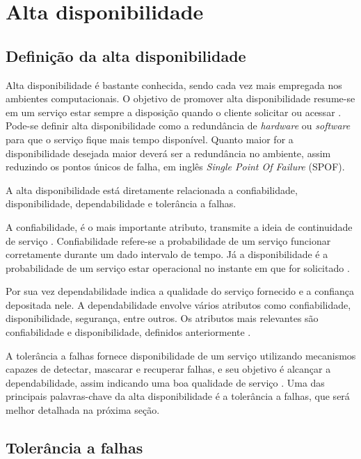 \chapter{Alta disponibilidade}

\section{Definição da alta disponibilidade}

Alta disponibilidade é bastante conhecida, sendo cada vez mais empregada nos ambientes computacionais.
O objetivo de promover alta disponibilidade resume-se em um serviço estar sempre 
a disposição quando o cliente solicitar ou acessar \cite{costa2009}.
Pode-se definir alta disponibilidade como a redundância de \textit{hardware} ou \textit{software} para que o serviço fique mais tempo disponível.
Quanto maior for a disponibilidade desejada maior deverá ser a redundância no ambiente, assim reduzindo os pontos únicos de falha,
em inglês \textit{Single Point Of Failure} (SPOF).

A alta disponibilidade está diretamente relacionada a confiabilidade, disponibilidade, dependabilidade e tolerância a falhas. 

A confiabilidade, é o mais importante atributo, transmite a ideia de continuidade de serviço \cite{pankaj1994}. Confiabilidade refere-se 
a probabilidade de um serviço funcionar corretamente durante um dado intervalo de tempo. Já a disponibilidade é a probabilidade de um 
serviço estar operacional no instante em que for solicitado \cite{costa2009}.

Por sua vez dependabilidade indica a qualidade do serviço fornecido e a confiança depositada nele. A dependabilidade envolve vários
atributos como confiabilidade, disponibilidade, segurança, entre outros. Os atributos mais relevantes são confiabilidade e disponibilidade,
definidos anteriormente \cite{weber2002}.

A tolerância a falhas fornece disponibilidade de um serviço utilizando mecanismos capazes de detectar, mascarar e recuperar falhas, 
e seu objetivo é alcançar a dependabilidade, assim indicando uma boa qualidade de serviço \cite{costa2009}.
Uma das principais palavras-chave da alta disponibilidade é a tolerância a falhas, que será melhor detalhada na próxima seção.

\section{Tolerância a falhas}

